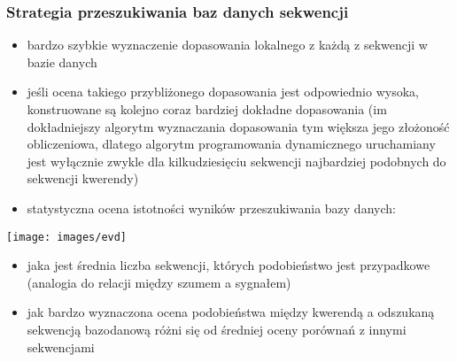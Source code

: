 \begin{frame}
\frametitle{Strategia przeszukiwania baz danych sekwencji}

\vspace*{-1ex}\begin{itemize}\raggedright\scriptsize

 \item bardzo szybkie wyznaczenie  dopasowania
 lokalnego z każdą z sekwencji w bazie danych

 \item jeśli ocena takiego przybliżonego dopasowania jest odpowiednio
 wysoka, konstruowane są kolejno coraz bardziej dokładne dopasowania
 (im dokładniejszy algorytm wyznaczania dopasowania tym większa jego
 złożoność obliczeniowa, dlatego algorytm programowania dynamicznego
 uruchamiany jest wyłącznie zwykle dla kilkudziesięciu sekwencji
 najbardziej podobnych do sekwencji kwerendy)


\item statystyczna ocena istotności wyników przeszukiwania bazy danych:
\end{itemize}

\vspace*{-2ex}%
\noindent\begin{minipage}[t]{.32\textwidth}\vspace{0pt}
\color{black}
\texttt{[image: images/evd]}
\end{minipage}\hfill%
\begin{minipage}[t]{.65\textwidth}\vspace{0pt}
\begin{itemize}\scriptsize
\item jaka jest średnia liczba sekwencji, których podobieństwo jest
przypadkowe (analogia do relacji między szumem a sygnałem)
\item jak bardzo wyznaczona ocena podobieństwa między kwerendą a
odszukaną sekwencją bazodanową różni się od średniej oceny porównań z
innymi sekwencjami
\end{itemize}


\end{minipage}
\end{frame}
